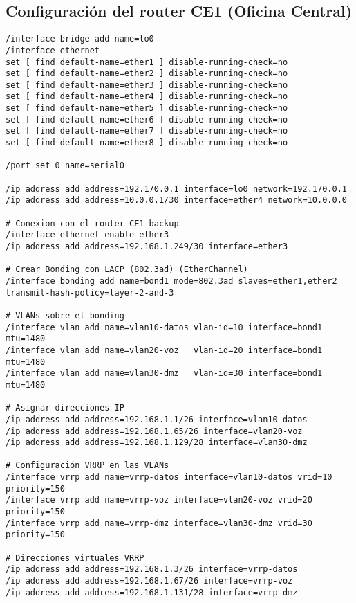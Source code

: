 \subsection{Configuración del router CE1 (Oficina Central)}
\label{Apendice2:configuracion_ce1_red_completa}
\begin{lstlisting}[language=RouterOS]
/interface bridge add name=lo0
/interface ethernet
set [ find default-name=ether1 ] disable-running-check=no
set [ find default-name=ether2 ] disable-running-check=no
set [ find default-name=ether3 ] disable-running-check=no
set [ find default-name=ether4 ] disable-running-check=no
set [ find default-name=ether5 ] disable-running-check=no
set [ find default-name=ether6 ] disable-running-check=no
set [ find default-name=ether7 ] disable-running-check=no
set [ find default-name=ether8 ] disable-running-check=no

/port set 0 name=serial0

/ip address add address=192.170.0.1 interface=lo0 network=192.170.0.1
/ip address add address=10.0.0.1/30 interface=ether4 network=10.0.0.0

# Conexion con el router CE1_backup
/interface ethernet enable ether3
/ip address add address=192.168.1.249/30 interface=ether3

# Crear Bonding con LACP (802.3ad) (EtherChannel)
/interface bonding add name=bond1 mode=802.3ad slaves=ether1,ether2 transmit-hash-policy=layer-2-and-3

# VLANs sobre el bonding
/interface vlan add name=vlan10-datos vlan-id=10 interface=bond1 mtu=1480
/interface vlan add name=vlan20-voz   vlan-id=20 interface=bond1 mtu=1480
/interface vlan add name=vlan30-dmz   vlan-id=30 interface=bond1 mtu=1480

# Asignar direcciones IP
/ip address add address=192.168.1.1/26 interface=vlan10-datos
/ip address add address=192.168.1.65/26 interface=vlan20-voz
/ip address add address=192.168.1.129/28 interface=vlan30-dmz

# Configuración VRRP en las VLANs
/interface vrrp add name=vrrp-datos interface=vlan10-datos vrid=10 priority=150
/interface vrrp add name=vrrp-voz interface=vlan20-voz vrid=20 priority=150
/interface vrrp add name=vrrp-dmz interface=vlan30-dmz vrid=30 priority=150

# Direcciones virtuales VRRP
/ip address add address=192.168.1.3/26 interface=vrrp-datos
/ip address add address=192.168.1.67/26 interface=vrrp-voz
/ip address add address=192.168.1.131/28 interface=vrrp-dmz


\end{lstlisting}
